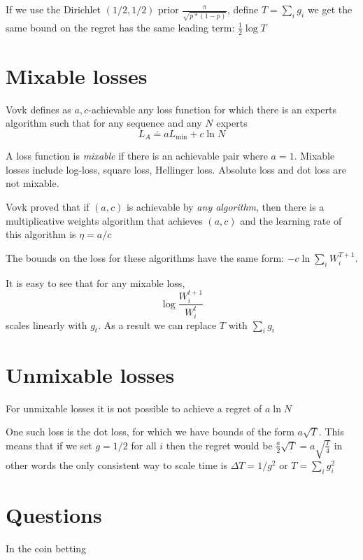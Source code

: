 \documentclass{article}
\begin{document}
If we use the Dirichlet $(1/2,1/2)$ prior $\frac{\pi}{\sqrt{p *(1-p)}}$, define $T=\sum_i g_i$ we get the same bound on the regret has the same leading term: $\frac{1}{2} \log T$

\section{Mixable losses}

Vovk defines as $a,c$-achievable any loss function for which there is an experts algorithm such that for any sequence and any $N$ experts
\[
L_A \doteq a L_{\mbox{min}} + c \ln N
\]

A loss function is {\em mixable} if there is an achievable pair where $a=1$.
Mixable losses include log-loss, square loss, Hellinger loss. Absolute loss and dot loss are not mixable.

Vovk proved that if $(a,c)$ is achievable by {\em any algorithm}, then there is a multiplicative weights algorithm that achieves $(a,c)$ and the learning rate of this algorithm is $\eta = a/c$

The bounds on the loss for these algorithms have the same form: $-c \ln \sum_i W_i^{T+1}$.

It is easy to see that for any mixable loss, $$\log \frac{W_i^{t+1}}{W_i^{t}} $$ scales linearly with $g_t$. As a result we can replace $T$ with $\sum_i g_i$

\section{Unmixable losses}
For unmixable losses it is not possible to achieve a regret of $a \ln N$

One such loss is the dot loss, for which we have bounds of the form $a \sqrt{T}$. This means that if we set $g=1/2$ for all $i$ then the regret would be 
$\frac{a}{2}\sqrt{T} = a \sqrt{\frac{T}{4}}$ in other words the only consistent way to scale time is ${\Delta T} = 1/g^2$ or $T = \sum_i g_i^2$

\section{Questions}

\begin{items}
\item In the coin betting 
\end{items}
\end{document}
